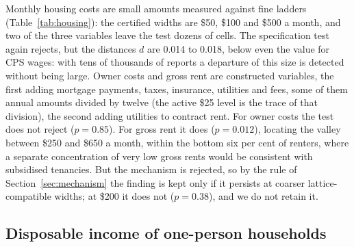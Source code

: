 Monthly housing costs are small amounts measured against fine ladders (Table~\ref{tab:housing}): the certified widths are \$50, \$100 and \$500 a month, and two of the three variables leave the test dozens of cells. The specification test again rejects, but the distances $d$ are 0.014 to 0.018, below even the value for CPS wages: with tens of thousands of reports a departure of this size is detected without being large. Owner costs and gross rent are constructed variables, the first adding mortgage payments, taxes, insurance, utilities and fees, some of them annual amounts divided by twelve (the active \$25 level is the trace of that division), the second adding utilities to contract rent. For owner costs the test does not reject ($p=0.85$). For gross rent it does ($p=0.012$), locating the valley between \$250 and \$650 a month, within the bottom six per cent of renters, where a separate concentration of very low gross rents would be consistent with subsidised tenancies. But the mechanism is rejected, so by the rule of Section~\ref{sec:mechanism} the finding is kept only if it persists at coarser lattice-compatible widths; at \$200 it does not ($p=0.38$), and we do not retain it.

\subsection{Disposable income of one-person households}

